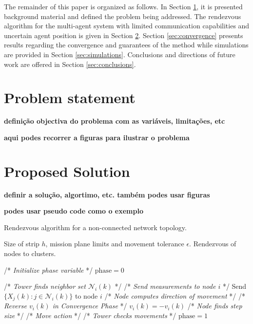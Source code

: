 \documentclass[letterpaper, 10 pt, conference]{ieeeconf}
\begin{document}
The remainder of this paper is organized as follows. In Section \ref{sec:problemstatement}, it is presented background material and defined the problem being addressed. The rendezvous algorithm for the multi-agent system with limited communication capabilities and uncertain agent position is given in Section \ref{sec:proposedsolution}. Section \ref{sec:convergence} presents results regarding the convergence and guarantees of the method while simulations are provided in Section \ref{sec:simulations}. Conclusions and directions of future work are offered in Section \ref{sec:conclusions}.

\section{Problem statement} \label{sec:problemstatement}
\textbf{definição objectiva do problema com as variáveis, limitações, etc}

\textbf{aqui podes recorrer a figuras para ilustrar o problema}

\section{Proposed Solution} \label{sec:proposedsolution}
\textbf{definir a solução, algortimo, etc. também podes usar figuras}


\textbf{podes usar pseudo code como o exemplo}


\begin{algorithm}
	\caption{Rendezvous algorithm for a non-connected network topology.}\label{alg:rendezvous}
	\begin{algorithmic}[1]
		\REQUIRE Size of strip $h$, mission plane limits and movement tolerance $\epsilon$.
		\ENSURE Rendezvous of nodes to clusters.

		\medskip
		\STATE /* \textit{Initialize phase variable} */
		\STATE $\textrm{phase} = 0$

				\STATE /* \textit{Tower finds neighbor set $\mathcal{N}_{i}(k)$} */
				\STATE /* \textit{Send measurements to node $i$} */
				\STATE Send $\{X_{j}(k): j \in \mathcal{N}_{i}(k)\}$ to node $i$
				\STATE /* \textit{Node computes direction of movement} */
					\STATE /* \textit{Reverse $v_{i}(k)$ in Convergence Phase} */
					\STATE $v_{i}(k) = -v_{i}(k)$
				\ENDIF
				\STATE /* \textit{Node finds step size} */
				\STATE /* \textit{Move action} */
			\ENDFOR
			\STATE /* \textit{Tower checks movements} */
				\STATE $\textrm{phase} = 1$
			\ENDIF
		\ENDFOR
	\end{algorithmic}
\end{algorithm}
\end{document}

